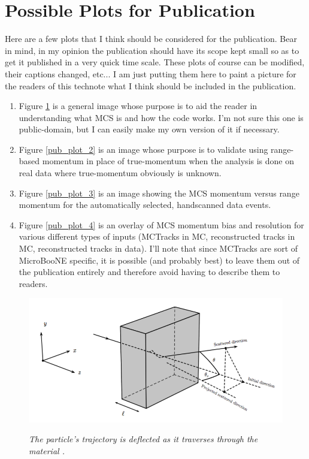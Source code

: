 \section{Possible Plots for Publication}
Here are a few plots that I think should be considered for the publication. Bear in mind, in my opinion the publication should have its scope kept small so as to get it published in a very quick time scale. These plots of course can be modified, their captions changed, etc... I am just putting them here to paint a picture for the readers of this technote what I think should be included in the publication.
\begin{enumerate}
	\item Figure \ref{pub_plot_1} is a general image whose purpose is to aid the reader in understanding what MCS is and how the code works. I'm not sure this one is public-domain, but I can easily make my own version of it if necessary.
	\item Figure \ref{pub_plot_2} is an image whose purpose is to validate using range-based momentum in place of true-momentum when the analysis is done on real data where true-momentum obviously is unknown.
	\item Figure \ref{pub_plot_3} is an image showing the MCS momentum versus range momentum for the automatically selected, handscanned data events.
	\item Figure \ref{pub_plot_4} is an overlay of MCS momentum bias and resolution for various different types of inputs ({\sc MCTracks} in MC, reconstructed tracks in MC, reconstructed tracks in data). I'll note that since {\sc MCTracks} are sort of MicroBooNE specific, it is possible (and probably best) to leave them out of the publication entirely and therefore avoid having to describe them to readers.
\end{enumerate}

\begin{figure}[ht!]
\centering
	\includegraphics[width=0.5\linewidth]{Figures/mcs_nocap.png} \\
\caption{\textit{The particle's trajectory is deflected as it traverses through the material \cite{leonidas1}.}}\label{pub_plot_1}
\end{figure}

